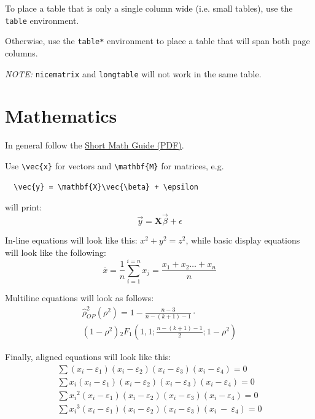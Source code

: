 \documentclass[submission, anonymous]{sedimentologika}
\begin{document}
To place a table that is only a single column wide (i.e. small tables), use the \verb|table| environment.

Otherwise, use the \verb|table*| environment to place a table that will span both page columns.

\textit{NOTE:} \verb|nicematrix| and \verb|longtable| will not work in the same table.

\section{Mathematics}

In general follow the \href{http://mirrors.ctan.org/info/short-math-guide/short-math-guide.pdf}{Short Math Guide (PDF)}.

Use \verb|\vec{x}| for vectors and \verb|\mathbf{M}| for matrices, e.g.
\begin{verbatim}
  \vec{y} = \mathbf{X}\vec{\beta} + \epsilon
\end{verbatim}
will print:
\begin{equation}
  \vec{y} = \mathbf{X}\vec{\beta} + \epsilon
\end{equation}

In-line equations will look like this: $x^2 + y^2 = z^2$, while basic display equations will look like the following:
\begin{equation}
  \overline{x} = \frac{1}{n}\sum_{i = 1}^{i = n}x_{j} = \frac{x_1 + x_2\ldots + x_n}{n}\label{eq:1}
\end{equation}

Multiline equations will look as follows:
\begin{multline}
  \hat{\rho}_{OP}^2\left(\rho^2\right)=1-\frac{n-3}{n-\left(k+1\right)-1}\cdot\\\left(1-\rho^2\right){{_2}F_1}\left(1,1;\frac{n-\left(k+1\right)-1}{2};1-\rho^2\right) \label{eq:2}
\end{multline}

Finally, aligned equations will look like this:
\begin{align}
  \sum\nolimits\left(x_i-\varepsilon_1\right)\left(x_i-\varepsilon_2\right)\left(x_i-\varepsilon_3\right)\left(x_i-\varepsilon_4\right)=0 \\
  \sum\nolimits{x_i\left(x_i-\varepsilon_1\right)\left(x_i-\varepsilon_2\right)\left(x_i-\varepsilon_3\right)\left(x_i-\varepsilon_4\right)}=0 \\
  \sum\nolimits{{x_i}^2\left(x_i-\varepsilon_1\right)\left(x_i-\varepsilon_2\right)\left(x_i-\varepsilon_3\right)\left(x_i-\varepsilon_4\right)}=0 \\
  \sum\nolimits{{x_i}^3\left(x_i-\varepsilon_1\right)\left(x_i-\varepsilon_2\right)\left(x_i-\varepsilon_3\right)\left(x_i\ -\ \varepsilon_4\right)}=0
\end{align}
\end{document}
